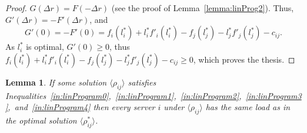 \documentclass[11pt]{article}
\newtheorem{lemma}[theorem]{Lemma}
\begin{document}
\begin{proof}
$G(\Delta r) = F(-\Delta r)$ (see the proof of Lemma~\ref{lemma:linProg2}).
Thus, $G'(\Delta r) = -F'(\Delta r)$, and
\begin{equation}
G'(0) = -F'(0) = 
f_{i}(l^{*}_i) + l^{*}_if'_{i}(l^{*}_i)  - f_{j}(l^{*}_j) - l^{*}_jf'_{j}(l^{*}_j) - c_{ij} \text{.}
\end{equation}
As $l^*_i$ is optimal, $G'(0) \geq 0$, thus $f_{i}(l^{*}_i) + l^{*}_if'_{i}(l^{*}_i)  - f_{j}(l^{*}_j) - l^{*}_jf'_{j}(l^{*}_j) - c_{ij} \geq 0$, which proves the thesis.
\end{proof}

\begin{lemma}\label{lemma:linProg}
If some solution $\langle \rho_{ij} \rangle$ satisfies Inequalities~\ref{in:linProgram0},~\ref{in:linProgram1},~\ref{in:linProgram2},~\ref{in:linProgram3},~and~\ref{in:linProgram4} then every server $i$ under $\langle \rho_{ij} \rangle$ has the same load as in the optimal solution $\langle \rho^{*}_{ij} \rangle$.
\end{lemma}
\end{document}
